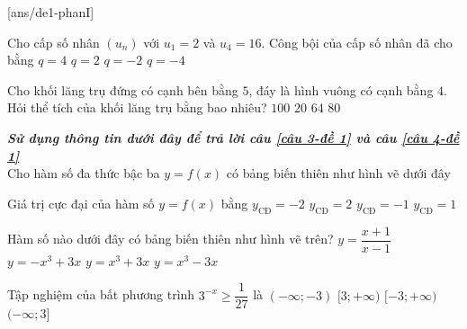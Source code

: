 \begin{name}
	{\tenchude}
	{\tendethi}
	{\tentruong}
	{\thoigian}
	\end{name}
\TN
{}[ans/de1-phanI]
\begin{ex}%
	Cho cấp số nhân $(u_n)$ với $u_1=2$ và $u_4=16$. Công bội của cấp số nhân đã cho bằng
	\choice
	{$q=4$}
	{\True $q=2$}
	{$q=-2$}
	{$q=-4$}
\end{ex}
\begin{ex}%
	Cho khối lăng trụ đứng có cạnh bên bằng $5$, đáy là hình vuông có cạnh bằng $4$. Hỏi thể tích của khối lăng trụ bằng bao nhiêu?
	\choice
	{$100$}
	{$20$}
	{$64$}
	{\True $80$}
\end{ex}
\textbf{\textit{Sử dụng thông tin dưới đây để trả lời câu \ref{câu 3-đề 1} và câu \ref{câu 4-đề 1}}}\\[0.5em]
Cho hàm số đa thức bậc ba $y=f(x)$ có bảng biến thiên như hình vẽ dưới đây
\begin{center}
\end{center}
\begin{ex}%
	\label{câu 3-đề 1}
	Giá trị cực đại của hàm số $y=f(x)$ bằng
	\choice
	{$y_{\text{CĐ}}=-2$}
	{\True $y_{\text{CĐ}}=2$}
	{$y_{\text{CĐ}}=-1$}
	{$y_{\text{CĐ}}=1$}
\end{ex}
\begin{ex}%
	\label{câu 4-đề 1}
	Hàm số nào dưới đây có bảng biến thiên như hình vẽ trên?\vspace{3pt}
	\choice
	{$y=\dfrac{x+1}{x-1}$}
	{$y=-x^3+3x$}
	{$y=x^3+3x$}
	{\True $y=x^3-3x$}
\end{ex}
\begin{ex}%
	Tập nghiệm của bất phương trình $3^{-x}\ge\dfrac{1}{27}$ là
	\choice
	{$(-\infty;-3)$}
	{$[3;+\infty)$}
	{$[-3;+\infty)$}
	{\True $(-\infty;3]$}
\end{ex}
